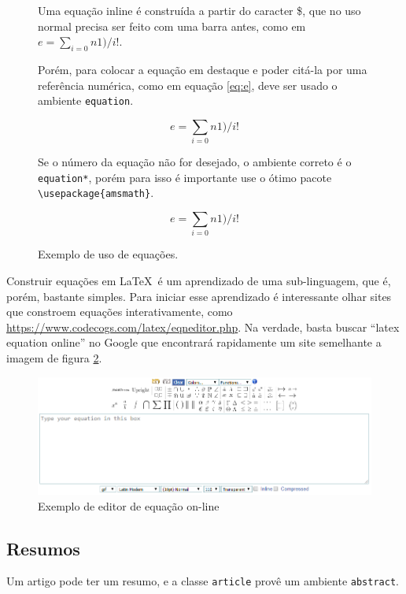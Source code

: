 \begin{figure}[hbt]
    \begin{LTXexample}[pos=b]
Uma equação inline é construída a partir do caracter
\$, que no uso normal precisa ser feito com uma barra
antes, como em $e=\sum_{i=0}{n}1)/i!$.

Porém, para colocar a equação em destaque e poder citá-la
por uma referência numérica, como em equação \ref{eq:e},
deve ser usado o ambiente
 \lstinline|equation|.

\begin{equation}\label{eq:e}
e=\sum_{i=0}{n}1)/i!
\end{equation}

Se o número da equação não for desejado, o ambiente
correto é o \lstinline|equation*|, porém para isso é
 importante use o ótimo pacote
  \lstinline|\usepackage{amsmath}|.


\begin{equation*}
e=\sum_{i=0}{n}1)/i!
\end{equation*}

    \end{LTXexample}
    \caption{Exemplo de uso de equações.}
    \label{fig:eq}
\end{figure}

Construir equações em \LaTeX\ é um aprendizado de uma sub-linguagem, que é, porém, bastante simples. Para iniciar esse aprendizado é interessante olhar sites que constroem equações interativamente, como \url{https://www.codecogs.com/latex/eqneditor.php}. Na verdade, basta buscar ``latex equation online'' no Google que encontrará rapidamente um site semelhante a imagem de figura \ref{fig:editor:eq}.

    \begin{figure}[hbt]
    \centering
    \includegraphics[width=.8\linewidth]{Images/equationeditor.png}
    \caption{Exemplo de editor de equação on-line}
    \label{fig:editor:eq}
\end{figure}

\subsection{Resumos}
Um artigo pode ter um resumo, e a classe \lstinline|article| provê um ambiente \lstinline|abstract|.
    

